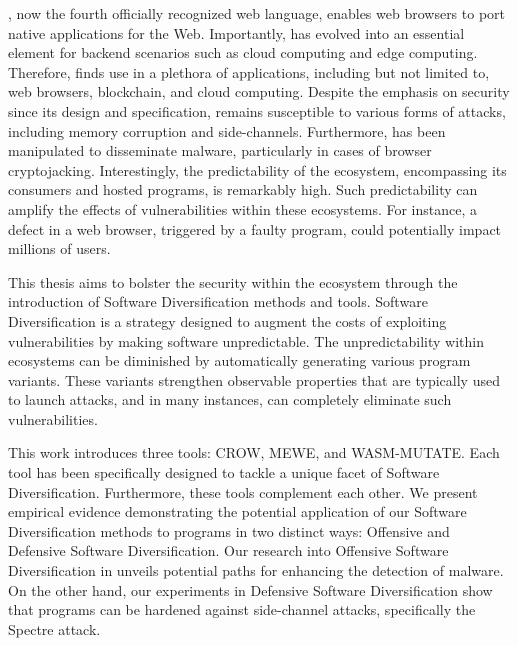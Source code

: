 \Wasm, now the fourth officially recognized web language, enables web browsers to port native applications for the Web. 
Importantly, \Wasm has evolved into an essential element for backend scenarios such as cloud computing and edge computing. 
Therefore, \Wasm finds use in a plethora of applications, including but not limited to, web browsers, blockchain, and cloud computing. 
Despite the emphasis on security since its design and specification, \Wasm remains susceptible to various forms of attacks, including memory corruption and side-channels. 
Furthermore, \Wasm has been manipulated to disseminate malware, particularly in cases of browser cryptojacking. 
Interestingly, the predictability of the \Wasm ecosystem, encompassing its consumers and hosted programs, is remarkably high. 
Such predictability can amplify the effects of vulnerabilities within these ecosystems. 
For instance, a defect in a web browser, triggered by a faulty \Wasm program, could potentially impact millions of users. 

This thesis aims to bolster the security within the \Wasm ecosystem through the introduction of Software Diversification methods and tools. 
Software Diversification is a strategy designed to augment the costs of exploiting vulnerabilities by making software unpredictable.
The unpredictability within ecosystems can be diminished by automatically generating various program variants. 
These variants strengthen observable properties that are typically used to launch attacks, and in many instances, can completely eliminate such vulnerabilities. 


This work introduces three tools: CROW, MEWE, and WASM-MUTATE. 
Each tool has been specifically designed to tackle a unique facet of Software Diversification. 
Furthermore, these tools complement each other. 
We present empirical evidence demonstrating the potential application of our Software Diversification methods to \Wasm programs in two distinct ways: Offensive and Defensive Software Diversification. 
Our research into Offensive Software Diversification in \Wasm unveils potential paths for enhancing the detection of \Wasm malware. 
On the other hand, our experiments in Defensive Software Diversification show that \Wasm programs can be hardened against side-channel attacks, specifically the Spectre attack.


